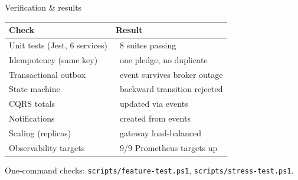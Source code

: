\documentclass[aspectratio=169]{beamer}
\newcommand{\good}{\textcolor{brandgreen}{\textbf{\checkmark}}}
\begin{document}
\begin{frame}{Verification \& results}
  \begin{table}\centering\small
    \begin{tabular}{@{}ll@{}}
      \toprule
      Check & Result \\
      \midrule
      Unit tests (Jest, 6 services) & \good\ 8 suites passing \\
      Idempotency (same key) & \good\ one pledge, no duplicate \\
      Transactional outbox & \good\ event survives broker outage \\
      State machine & \good\ backward transition rejected \\
      CQRS totals & \good\ updated via events \\
      Notifications & \good\ created from events \\
      Scaling (replicas) & \good\ gateway load-balanced \\
      Observability targets & \good\ 9/9 Prometheus targets up \\
      \bottomrule
    \end{tabular}
  \end{table}
  \begin{center}\scriptsize One-command checks: \texttt{scripts/feature-test.ps1}, \texttt{scripts/stress-test.ps1}.\end{center}
\end{frame}
\end{document}
